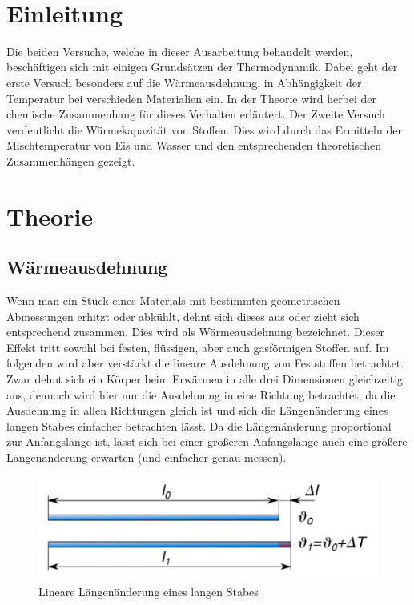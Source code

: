 \documentclass[a4paper]{scrartcl}
\def\header#1#2{
  \begin{center}
    {\Large #1}\\
    {#2}
  \end{center}
}
\numberwithin{equation}{subsection}
\begin{document}
\vspace{10pt}
\header{\HEADDING}{\SUBHEADDING}

\tableofcontents

\newpage

\section{Einleitung}
Die beiden Versuche, welche in dieser Ausarbeitung behandelt werden, beschäftigen sich mit einigen Grundsätzen der Thermodynamik. Dabei geht der erste Versuch besonders auf die Wärmeausdehnung, in Abhängigkeit der Temperatur bei verschieden Materialien ein. In der Theorie wird herbei der chemische Zusammenhang für dieses Verhalten erläutert.
Der Zweite Versuch verdeutlicht die Wärmekapazität von Stoffen. Dies wird durch das Ermitteln der Mischtemperatur von Eis und Wasser und den entsprechenden theoretischen Zusammenhängen gezeigt. 

\newpage
\section{Theorie}
\subsection{Wärmeausdehnung}

Wenn man ein Stück eines Materials mit bestimmten geometrischen Abmessungen erhitzt oder abkühlt, dehnt sich dieses aus oder zieht sich entsprechend zusammen. Dies wird als Wärmeausdehnung bezeichnet. 
Dieser Effekt tritt sowohl bei festen, flüssigen, aber auch gasförmigen Stoffen auf. Im folgenden wird aber verstärkt die lineare Ausdehnung von Feststoffen betrachtet. \cite{hering} \\

Zwar dehnt sich ein Körper beim Erwärmen in alle drei Dimensionen gleichzeitig aus, dennoch wird hier nur die Ausdehnung in eine Richtung betrachtet, da die Ausdehnung in allen Richtungen gleich ist und sich die Längenänderung eines langen Stabes einfacher betrachten lässt. Da die Längenänderung proportional zur Anfangslänge ist, lässt sich bei einer größeren Anfangslänge auch eine größere Längenänderung erwarten (und einfacher genau messen). \cite{werk}

\begin{figure}[H]
\includegraphics[width=12cm]{Abbildungen/lineare_ausdehnung}
\centering
\caption{Lineare Längenänderung eines langen Stabes \protect\footnotemark}
\centering
\label{fig:lineare-ausdehnung}
\end{figure}
\end{document}
